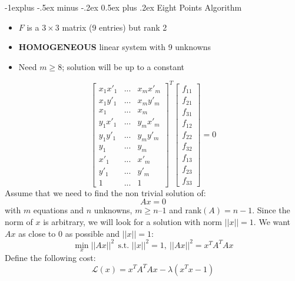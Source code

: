 \documentclass[10pt,landscape]{article}
\makeatletter
\renewcommand{\subsection}{\@startsection{subsection}{2}{0mm}%
                                {-1explus -.5ex minus -.2ex}%
                                {0.5ex plus .2ex}%
                                {\normalfont\normalsize\bfseries}}
\makeatother
\begin{document}
\begin{multicols}{3}
\subsection{Eight Points Algorithm}
\begin{itemize}
    \item $F$ is a $3\times3$ matrix (9 entries) but rank 2
    \item \textbf{HOMOGENEOUS} linear system with 9 unknowns
    \item Need $m \geq 8$; solution will be up to a constant
\end{itemize}
\begin{equation*}
    \left[ \begin{array}{ccc}
x_1x'_1 & ... & x_mx'_m\\
 x_1y'_1 & ... & x_my'_m \\
 x_1 & ... & x_m\\
 y_1x'_1 & ... & y_mx'_m\\
 y_1y'_1 & ... & y_my'_m\\
 y_1 & ... & y_m\\
 x'_1 & ... & x'_m\\
 y'_1 & ... & y'_m\\
 1 & ... & 1
    \end{array} \right ]^T    \left[ \begin{array}{c}
f_11\\
f_21\\
f_31\\
f_12\\
f_22\\
f_32\\
f_13\\
f_23\\
f_33
    \end{array} \right ] = 0
\end{equation*}
Assume that we need to find the non trivial solution of:
\begin{equation*}
    Ax=0
\end{equation*}
with $m$ equations and $n$ unknowns, $m \geq n – 1$ and rank$(A) = n-1$. Since the norm of $x$ is arbitrary, we will look for a solution
with norm $||x|| = 1$. We want $Ax$ as close to $0$ as possible and $||x|| =1$:
\begin{equation*}
    \min_x ||Ax||^2\ \ \text{s.t. } ||x||^2 = 1,\ ||Ax||^2 = x^TA^TAx
\end{equation*}
Define the following cost:
\begin{equation*}
\mathscr{L}(x) = x^TA^TAx - \lambda(x^Tx - 1)

\end{equation*}
\end{multicols}
\end{document}
